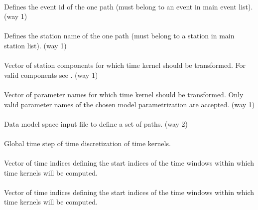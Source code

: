 \paragraph{ }
Defines the event id of the one path (must belong to an event in main event list). (way 1)
\paragraph{ }
Defines the station name of the one path (must belong to a station in main station list). (way 1)
\paragraph{}
Vector of station components for which time kernel should be transformed. 
For valid components see . (way 1)
\paragraph{}
Vector of parameter names for which time kernel should be transformed. 
Only valid parameter names of the chosen model parametrization are accepted. (way 1)
\paragraph{}
Data model space input file to define a set of paths. (way 2)
\paragraph{}
Global time step of time discretization of time kernels.
\paragraph{}
Vector of  time indices defining the start indices of the  time windows 
within which time kernels will be computed.
\paragraph{}
Vector of  time indices defining the start indices of the  time windows
within which time kernels will be computed.
